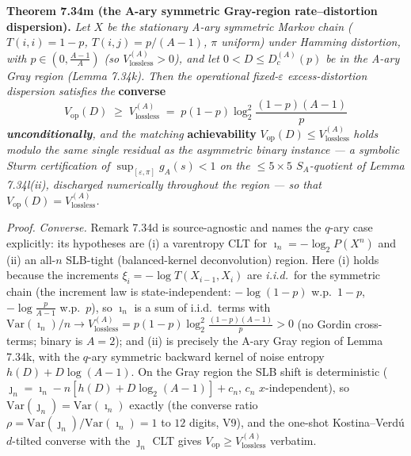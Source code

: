 \documentclass[
]{article}
\begin{document}
\textbf{Theorem 7.34m (the A-ary symmetric Gray-region rate--distortion
dispersion).} \emph{Let $X$ be the stationary A-ary symmetric Markov chain
($T(i,i)=1-p$, $T(i,j)=p/(A-1)$, $\pi$ uniform) under Hamming distortion, with
$p\in(0,\tfrac{A-1}A)$ \emph{(}so $V_{\mathrm{lossless}}^{(A)}>0$\emph{)}, and
let $0<D\le D_c^{(A)}(p)$ be in the A-ary Gray region (Lemma 7.34k). Then the
operational fixed-$\varepsilon$ excess-distortion dispersion satisfies the}
\textbf{converse}
\[
  V_{\mathrm{op}}(D)\;\ge\;V_{\mathrm{lossless}}^{(A)}
  \;=\;p(1-p)\log_2^2\frac{(1-p)(A-1)}{p}
\]
\emph{\textbf{unconditionally}, and the matching} \textbf{achievability}
$V_{\mathrm{op}}(D)\le V_{\mathrm{lossless}}^{(A)}$ \emph{holds modulo the same
single residual as the asymmetric binary instance --- a symbolic Sturm
certification of $\sup_{[\varepsilon,\pi]}g_A(s)<1$ on the $\le5\times5$
$S_A$-quotient of Lemma 7.34l(ii), discharged numerically throughout the
region --- so that $V_{\mathrm{op}}(D)=V_{\mathrm{lossless}}^{(A)}$.}

\emph{Proof.} \emph{Converse.} Remark 7.34d is source-agnostic and names the
$q$-ary case explicitly: its hypotheses are (i) a varentropy CLT for
$\imath_n=-\log_2P(X^n)$ and (ii) an all-$n$ SLB-tight (balanced-kernel
deconvolution) region. Here (i) holds because the increments
$\xi_i=-\log T(X_{i-1},X_i)$ are \emph{i.i.d.}\ for the symmetric chain (the
increment law is state-independent: $-\log(1-p)$ w.p.\ $1-p$,
$-\log\tfrac p{A-1}$ w.p.\ $p$), so $\imath_n$ is a sum of i.i.d.\ terms with
$\mathrm{Var}(\imath_n)/n\to V_{\mathrm{lossless}}^{(A)}=p(1-p)\log_2^2
\tfrac{(1-p)(A-1)}p>0$ (no Gordin cross-terms; binary is $A=2$); and (ii) is
precisely the A-ary Gray region of Lemma 7.34k, with the $q$-ary symmetric
backward kernel of noise entropy $h(D)+D\log(A-1)$. On the Gray region the SLB
shift is deterministic ($\jmath_n=\imath_n-n[h(D)+D\log_2(A-1)]+c_n$, $c_n$
$x$-independent), so $\mathrm{Var}(\jmath_n)=\mathrm{Var}(\imath_n)$ exactly
(the converse ratio $\rho=\mathrm{Var}(\jmath_n)/\mathrm{Var}(\imath_n)=1$ to
$12$ digits, V9), and the one-shot Kostina--Verd\'u $d$-tilted converse with
the $\jmath_n$ CLT gives $V_{\mathrm{op}}\ge V_{\mathrm{lossless}}^{(A)}$ verbatim.
\end{document}
